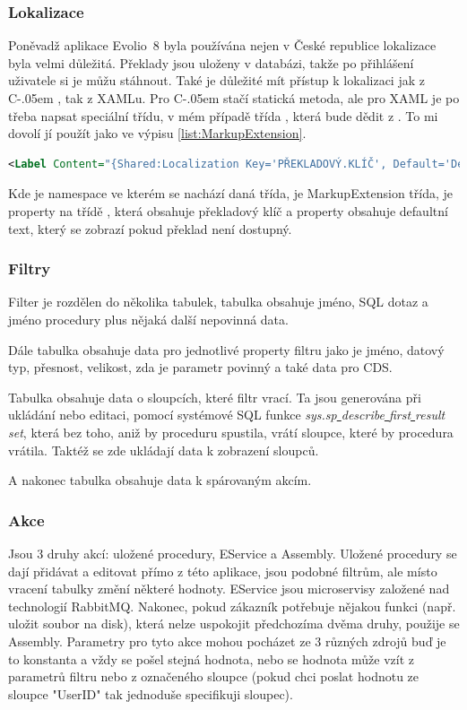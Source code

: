 \documentclass[czech,bachelorpractice,dept460,male,csharp]{diploma}
\newcommand{\EvolioEight}{Evolio~8}
\newcommand{\Csharp}{%
  {\settoheight{\dimen0}{C}C\kern-.05em \resizebox{!}{\dimen0}{\raisebox{\depth}{\#}}}}
\newcommand{\un}{\underline{ }}
\begin{document}
		\subsubsection{Lokalizace}
			Poněvadž aplikace {\EvolioEight} byla používána nejen v České republice lokalizace byla velmi důležitá. Překlady jsou uloženy v databázi, takže po přihlášení uživatele si je můžu stáhnout. Také je důležité mít přístup k lokalizaci jak z {\Csharp}, tak z XAMLu. Pro {\Csharp} stačí statická metoda, ale pro XAML je po třeba napsat speciální třídu, v mém případě třída , která bude dědit z . To mi dovolí jí
použít jako ve výpisu \ref{list:MarkupExtension}.
			\begin{lstlisting}[language=XML,caption={MarkupExtension příkad},label={list:MarkupExtension}]
<Label Content="{Shared:Localization Key='PŘEKLADOVÝ.KLÍČ', Default='Defaultní text'}"/>
			\end{lstlisting}
			 Kde  je namespace ve kterém se nachází daná třída,  je MarkupExtension třída,  je property na třídě , která obsahuje překladový klíč a property  obsahuje defaultní text, který se zobrazí pokud překlad není dostupný.
		\subsubsection{Filtry}
			Filter je rozdělen do několika tabulek, tabulka  obsahuje jméno, SQL dotaz a jméno procedury plus nějaká další nepovinná data. 
			
			Dále tabulka  obsahuje data pro jednotlivé property filtru jako je jméno, datový typ, přesnost, velikost, zda je parametr povinný a také data pro CDS. 
			
			Tabulka  obsahuje data o sloupcích, které filtr vrací. Ta jsou generována při ukládání nebo editaci, pomocí systémové SQL funkce \textit{sys.sp{\un}describe{\un}first{\un}result{\un}set}, která bez toho, aniž by proceduru spustila, vrátí sloupce, které by procedura vrátila. Taktéž se zde ukládají data k zobrazení sloupců. 
			
			A nakonec tabulka  obsahuje data k spárovaným akcím.
			
		\subsubsection{Akce}
			Jsou 3 druhy akcí: uložené procedury, EService a Assembly. Uložené procedury se dají přidávat a editovat přímo z této aplikace, jsou podobné filtrům, ale místo vracení tabulky změní některé hodnoty. EService jsou microservisy založené nad technologií RabbitMQ. Nakonec, pokud zákazník potřebuje nějakou funkci (např. uložit soubor na disk), která nelze uspokojit předchozíma dvěma druhy, použije se Assembly. Parametry pro tyto akce mohou pocházet ze 3 různých zdrojů buď je to konstanta a vždy se pošel stejná hodnota, nebo se hodnota může vzít z parametrů filtru nebo z označeného sloupce (pokud chci poslat hodnotu ze sloupce "UserID" tak jednoduše specifikuji sloupec). 
\end{document}
